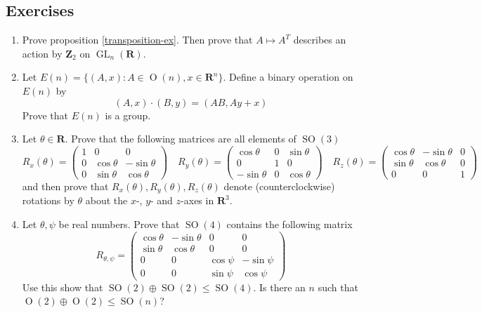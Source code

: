 \documentclass[12pt]{article}
\numberwithin{equation}{subsection}
\theoremstyle{note}
\newcommand{\GL}{\operatorname{GL}}
\newcommand{\Or}{\operatorname{O}}
\newcommand{\SO}{\operatorname{SO}}
\begin{document}
\subsection{Exercises}
\begin{enumerate}[label=\arabic*.]

	\item Prove proposition \ref{transposition-ex}. Then prove that $A\mapsto A^T$ describes an action by $\mathbf{Z}_2$ on $\GL_n(\mathbf{R})$. 
	\item Let $E(n)=\{ (A,x) : A\in \Or(n), x\in \mathbf{R}^n\}$. Define a binary operation on $E(n)$ by \[(A,x)\cdot (B,y)=(AB,Ay+x)\] Prove that $E(n)$ is a group.
	
	\item \label{rotations-R3} Let $\theta\in\mathbf{R}$. Prove that the following matrices are all elements of $\SO(3)$ \[ R_x(\theta)=\begin{pmatrix} 1 & 0 & 0 \\ 0 & \cos\theta & -\sin\theta \\ 0 & \sin\theta & \cos\theta \end{pmatrix} \quad 
	R_y(\theta)=\begin{pmatrix} \cos\theta & 0 &  \sin\theta \\ 0 &1 & 0 \\-\sin\theta & 0 & \cos\theta \end{pmatrix} \quad 
	R_z(\theta)=\begin{pmatrix}  \cos\theta & -\sin\theta& 0 \\ \sin\theta & \cos\theta & 0 \\ 0 & 0 & 1\end{pmatrix}\]
	and then prove that $R_x(\theta),R_y(\theta),R_z(\theta)$ denote (counterclockwise) rotations by $\theta$ about the $x$-, $y$- and $z$-axes in $\mathbf{R}^3$. 
	
	\item Let $\theta,\psi$ be real numbers. Prove that $\SO(4)$ contains the following matrix \[ R_{\theta,\psi} = \begin{pmatrix} \cos \theta & - \sin\theta & 0 & 0 \\
\sin\theta & \cos\theta & 0 & 0 \\
0 & 0 & \cos\psi & -\sin\psi \\
0 & 0 & \sin\psi & \cos\psi\end{pmatrix}\]
Use this show that $\SO(2)\oplus \SO(2)\leq \SO(4)$. Is there an $n$ such that $\Or(2)\oplus \Or(2)\leq \SO(n)$?


\end{enumerate}
\end{document}
